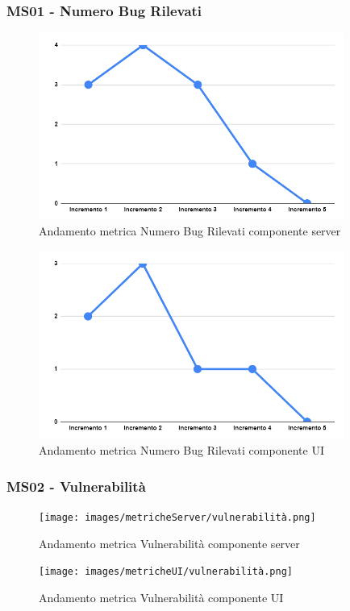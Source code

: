\subsubsection{MS01 - Numero Bug Rilevati}
\begin{figure}[H]
	\centering
	\includegraphics[width=10cm]{images/metricheServer/bug_rilevati.png}
	\caption{Andamento metrica Numero Bug Rilevati componente server}
\end{figure}
\begin{figure}[H]
	\centering
	\includegraphics[width=10cm]{images/metricheUI/bug_rilevati.png}
	\caption{Andamento metrica Numero Bug Rilevati componente UI}
\end{figure}

\subsubsection{MS02 - Vulnerabilità}
\begin{figure}[H]
	\centering
	\texttt{[image: images/metricheServer/vulnerabilità.png]}
	\caption{Andamento metrica Vulnerabilità componente server}
\end{figure}
\begin{figure}[H]
	\centering
	\texttt{[image: images/metricheUI/vulnerabilità.png]}
	\caption{Andamento metrica Vulnerabilità componente UI}
\end{figure}

